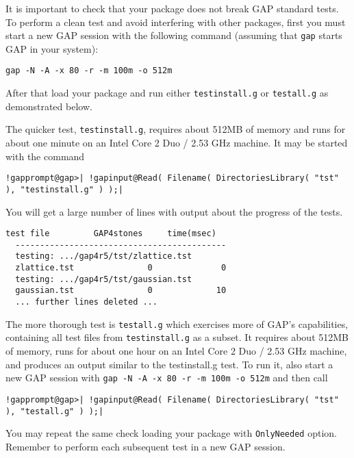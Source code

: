 \documentclass[a4paper,11pt]{report}
\begin{document}
{{{ It is important to check that your package does not break \textsf{GAP} standard tests. To perform a clean test and avoid interfering with other
packages, first you must start a new \textsf{GAP} session with the following command (assuming that \texttt{gap} starts \textsf{GAP} in your system): 
\begin{Verbatim}[commandchars=!@|,fontsize=\small,frame=single,label=Example]
  gap -N -A -x 80 -r -m 100m -o 512m
\end{Verbatim}
 After that load your package and run either \texttt{testinstall.g} or \texttt{testall.g} as demonstrated below. 

 The quicker test, \texttt{testinstall.g}, requires about 512MB of memory and runs for about one minute on an Intel
Core 2 Duo / 2.53 GHz machine. It may be started with the command 
\begin{Verbatim}[commandchars=!@|,fontsize=\small,frame=single,label=Example]
  !gapprompt@gap>| !gapinput@Read( Filename( DirectoriesLibrary( "tst" ), "testinstall.g" ) );|
\end{Verbatim}
 You will get a large number of lines with output about the progress of the
tests. 
\begin{Verbatim}[commandchars=!@|,fontsize=\small,frame=single,label=Example]
  test file         GAP4stones     time(msec)
  -------------------------------------------
  testing: .../gap4r5/tst/zlattice.tst
  zlattice.tst               0              0
  testing: .../gap4r5/tst/gaussian.tst
  gaussian.tst               0             10
  ... further lines deleted ...
\end{Verbatim}
 

 The more thorough test is \texttt{testall.g} which exercises more of \textsf{GAP}'s capabilities, containing all test files from \texttt{testinstall.g} as a subset. It requires about 512MB of memory, runs for about one hour on an
Intel Core 2 Duo / 2.53 GHz machine, and produces an output similar to the
testinstall.g test. To run it, also start a new \textsf{GAP} session with \texttt{gap -N -A -x 80 -r -m 100m -o 512m} and then call 
\begin{Verbatim}[commandchars=!@|,fontsize=\small,frame=single,label=Example]
  !gapprompt@gap>| !gapinput@Read( Filename( DirectoriesLibrary( "tst" ), "testall.g" ) );|
\end{Verbatim}
 You may repeat the same check loading your package with \texttt{OnlyNeeded} option. Remember to perform each subsequent test in a new \textsf{GAP} session. 

}}}
\end{document}
